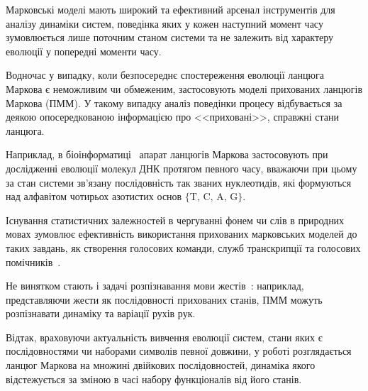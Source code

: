 Марковські моделі мають широкий та ефективний арсенал інструментів для аналізу динаміки систем, поведінка яких у кожен наступний момент часу зумовлюється лише поточним станом системи та не залежить від характеру еволюції у попередні моменти часу. 

Водночас у випадку, коли безпосереднє спостереження еволюції ланцюга Маркова є неможливим чи обмеженим, застосовують моделі прихованих ланцюгів Маркова (ПММ). У такому випадку аналіз поведінки процесу відбувається за деякою опосередкованою інформацією про <<приховані>>, справжні стани ланцюга. 

Наприклад, в біоінформатиці~\cite[глава 9]{Koski2001} апарат ланцюгів Маркова застосовують при дослідженні еволюції молекул ДНК протягом певного часу, вважаючи при цьому за стан системи зв'язану послідовність так званих нуклеотидів, які формуються над алфавітом чотирьох азотистих основ $\{\text{T, C, A, G} \}$.  

Існування статистичних залежностей в чергуванні фонем чи слів в природних мовах зумовлює ефективність використання прихованих марковських моделей до таких завдань, як створення голосових команди, служб транскрипції та голосових помічників~\cite{Rabiner1989}.

Не винятком стають і задачі розпізнавання мови жестів~\cite{Chaaraoui2013}: наприклад, представляючи жести як послідовності прихованих станів, ПММ можуть розпізнавати динаміку та варіації рухів рук.

Відтак, враховуючи актуальність вивчення еволюції систем, стани яких є послідовностями чи наборами символів певної довжини, у роботі розглядається ланцюг Маркова на множині двійкових послідовностей, динаміка якого відстежується за зміною в часі набору функціоналів від його станів.